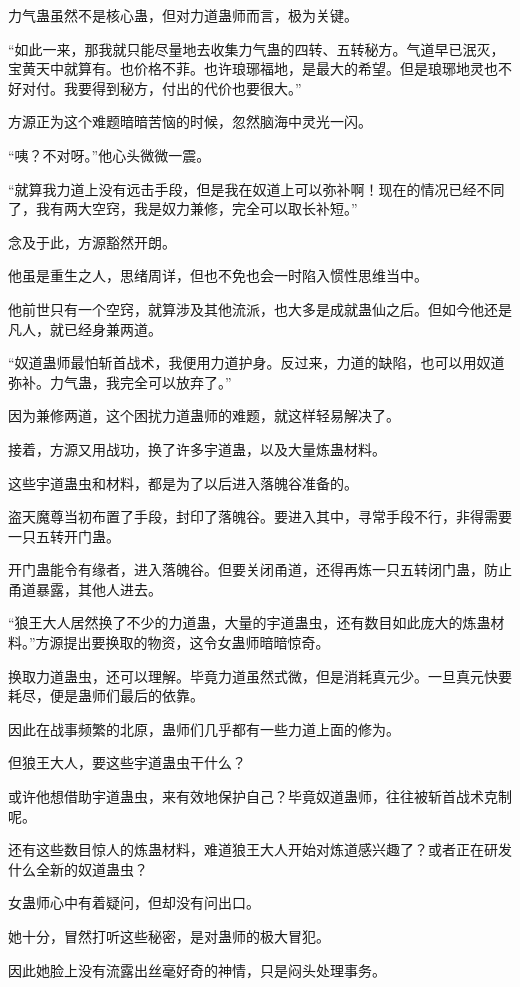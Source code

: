 \begin{this_body}
力气蛊虽然不是核心蛊，但对力道蛊师而言，极为关键。

“如此一来，那我就只能尽量地去收集力气蛊的四转、五转秘方。气道早已泯灭，宝黄天中就算有。也价格不菲。也许琅琊福地，是最大的希望。但是琅琊地灵也不好对付。我要得到秘方，付出的代价也要很大。”

方源正为这个难题暗暗苦恼的时候，忽然脑海中灵光一闪。

“咦？不对呀。”他心头微微一震。

“就算我力道上没有远击手段，但是我在奴道上可以弥补啊！现在的情况已经不同了，我有两大空窍，我是奴力兼修，完全可以取长补短。”

念及于此，方源豁然开朗。

他虽是重生之人，思绪周详，但也不免也会一时陷入惯性思维当中。

他前世只有一个空窍，就算涉及其他流派，也大多是成就蛊仙之后。但如今他还是凡人，就已经身兼两道。

“奴道蛊师最怕斩首战术，我便用力道护身。反过来，力道的缺陷，也可以用奴道弥补。力气蛊，我完全可以放弃了。”

因为兼修两道，这个困扰力道蛊师的难题，就这样轻易解决了。

接着，方源又用战功，换了许多宇道蛊，以及大量炼蛊材料。

这些宇道蛊虫和材料，都是为了以后进入落魄谷准备的。

盗天魔尊当初布置了手段，封印了落魄谷。要进入其中，寻常手段不行，非得需要一只五转开门蛊。

开门蛊能令有缘者，进入落魄谷。但要关闭甬道，还得再炼一只五转闭门蛊，防止甬道暴露，其他人进去。

“狼王大人居然换了不少的力道蛊，大量的宇道蛊虫，还有数目如此庞大的炼蛊材料。”方源提出要换取的物资，这令女蛊师暗暗惊奇。

换取力道蛊虫，还可以理解。毕竟力道虽然式微，但是消耗真元少。一旦真元快要耗尽，便是蛊师们最后的依靠。

因此在战事频繁的北原，蛊师们几乎都有一些力道上面的修为。

但狼王大人，要这些宇道蛊虫干什么？

或许他想借助宇道蛊虫，来有效地保护自己？毕竟奴道蛊师，往往被斩首战术克制呢。

还有这些数目惊人的炼蛊材料，难道狼王大人开始对炼道感兴趣了？或者正在研发什么全新的奴道蛊虫？

女蛊师心中有着疑问，但却没有问出口。

她十分，冒然打听这些秘密，是对蛊师的极大冒犯。

因此她脸上没有流露出丝毫好奇的神情，只是闷头处理事务。


\end{this_body}
